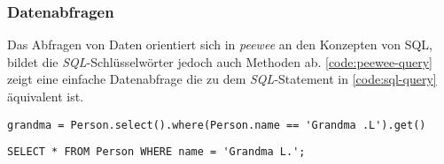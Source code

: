 \subsubsection*{Datenabfragen}

Das Abfragen von Daten orientiert sich in \emph{peewee} an den Konzepten von SQL, bildet die \emph{SQL}-Schlüsselwörter jedoch auch Methoden ab. \autoref{code:peewee-query} zeigt eine einfache Datenabfrage die zu dem \emph{SQL}-Statement in \autoref{code:sql-query} äquivalent ist.

\lstset{language=python}
\begin{lstlisting}[caption={Python-Code zum Abfragen eines Objektes aus der Datenbank.  \cite{noauthor_quickstart_2023}}, label=code:peewee-query]
    grandma = Person.select().where(Person.name == 'Grandma .L').get()
\end{lstlisting}

\lstset{language=sql}
\begin{lstlisting}[caption={\emph{SQL}-Abfrage mit SELECT und WHERE.}, label=code:sql-query]
    SELECT * FROM Person WHERE name = 'Grandma L.';
\end{lstlisting}
